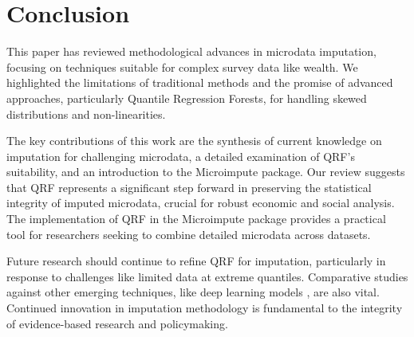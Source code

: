 \section{Conclusion}

This paper has reviewed methodological advances in microdata imputation, focusing on techniques suitable for complex survey data like wealth. We highlighted the limitations of traditional methods and the promise of advanced approaches, particularly Quantile Regression Forests, for handling skewed distributions and non-linearities.

The key contributions of this work are the synthesis of current knowledge on imputation for challenging microdata, a detailed examination of QRF's suitability, and an introduction to the Microimpute package. Our review suggests that QRF represents a significant step forward in preserving the statistical integrity of imputed microdata, crucial for robust economic and social analysis. The implementation of QRF in the Microimpute package provides a practical tool for researchers seeking to combine detailed microdata across datasets.

Future research should continue to refine QRF for imputation, particularly in response to challenges like limited data at extreme quantiles. Comparative studies against other emerging techniques, like deep learning models \citep{alaa2024deep}, are also vital. Continued innovation in imputation methodology is fundamental to the integrity of evidence-based research and policymaking.
